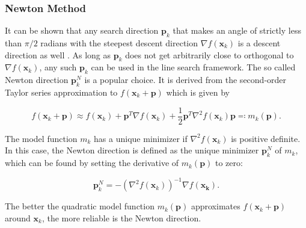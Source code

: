 \subsubsection{Newton Method}\label{sss:newton-method}
It can be shown that any search direction $\bm{p}_k$ that makes an angle of strictly less than $\pi/2$ radians with the steepest descent
direction $\nabla f(\bm{x}_k)$ is a descent direction as well \cite{nocedal2006}. As long as $\bm{p}_k$ does not get arbitrarily close to 
orthogonal to $\nabla f(\bm{x}_k)$, any such $\bm{p}_k$ can be used in the line search framework. The so called Newton direction $\bm{p}^N_k$ 
is a popular choice. It is derived from the second-order Taylor series approximation to $f(\bm{x}_k + \bm{p})$ which is given by

\begin{equation}\label{eq:newton-model}
    f(\bm{x}_k + \bm{p}) \approx f(\bm{x}_k) + \bm{p}^T \nabla f(\bm{x}_k) + \frac{1}{2}\bm{p}^T \nabla^2 f(\bm{x}_k) \bm{p} \eqqcolon 
    m_k(\bm{p}).
\end{equation}

\noindent The model function $m_k$ has a unique minimizer if $\nabla^2 f(\bm{x}_k)$ is positive definite. In this case, the Newton direction 
is defined
as the unique minimizer $\bm{p}^N_k$ of $m_k$, which can be found by setting the derivative of $m_k(\bm{p})$ to zero:

\begin{equation}\label{eq:newton-diretion}
    \bm{p}^N_k = - (\nabla^2 f(\bm{x}_k))^{-1} \nabla f(\bm{x_k}).
\end{equation}

\noindent The better the quadratic model function $m_k(\bm{p})$ approximates $f(\bm{x}_k + \bm{p})$ around $\bm{x}_k$, the more reliable is the 
Newton direction. 

